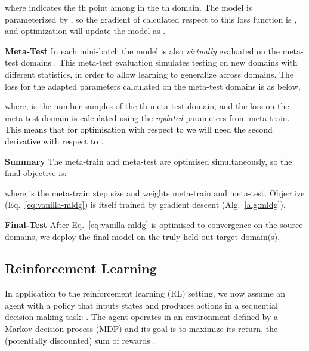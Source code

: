 \documentclass[letterpaper]{article} \usepackage{aaai18}  \usepackage{times}  \usepackage{helvet}  \usepackage{courier}  \usepackage{url}  \usepackage{graphicx}  \usepackage{amsmath}
\newcommand{\keypoint}[1]{\vspace{0.1cm}\noindent\textbf{#1}\quad}
\begin{document}
\noindent where  indicates the th point among  in the th domain. The model is parameterized by , so the gradient of  calculated respect to this loss function is , and optimization will update the model as .


\keypoint{Meta-Test} In each mini-batch 
the model is also \textit{virtually} evaluated on the  meta-test domains . This meta-test evaluation simulates testing on new domains with different statistics, in order to allow {learning} to generalize across domains. The loss for the adapted parameters calculated on the meta-test domains is as below,

where,  is the number samples of the th meta-test domain, and the loss on the meta-test domain is calculated using the \emph{updated} parameters  from meta-train. \textcolor{black}{This means that for optimisation with respect to  we will need the second derivative with respect to .}



\keypoint{Summary} The meta-train and meta-test are optimised simultaneously, so the final objective is:


\noindent where  is the meta-train step size and  weights meta-train and meta-test. Objective (Eq.~\ref{eq:vanilla-mldg}) is itself trained by gradient descent (Alg.~\ref{alg:mldg}).

\keypoint{Final-Test} After Eq.~\ref{eq:vanilla-mldg} is optimised to convergence on the source domains, we deploy the final model  on the truly held-out target domain(s).





\subsection{Reinforcement Learning}
In application to the reinforcement learning (RL) setting, we now assume an agent with a policy  that inputs states  and produces actions  in a sequential decision making task: . The agent operates in an environment defined by a Markov decision process (MDP)  and its goal is to maximize its return, the (potentially discounted) sum of rewards \textcolor{black}{}. 
\end{document}
